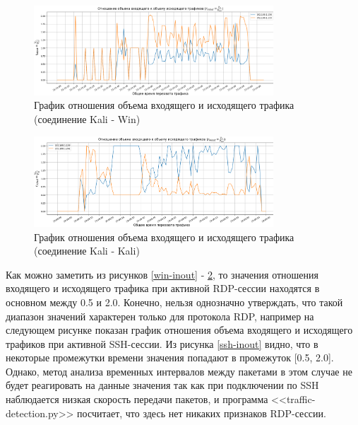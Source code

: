 \documentclass[bachelor, och, coursework]{SCWorks}
\begin{document}


\begin{figure}[H]
  \centering
  \includegraphics[width=0.8\textwidth]{photo/inout-kalwin.png}
  \caption{График отношения объема входящего и исходящего трафика (соединение Kali - Win)}
  \label{kalwin-inout}
\end{figure}


\begin{figure}[H]
  \centering
  \includegraphics[width=0.8\textwidth]{photo/inout-kali.png}
  \caption{График отношения объема входящего и исходящего трафика (соединение Kali - Kali)}
  \label{kali-inout}
\end{figure}

Как можно заметить из рисунков \ref{win-inout} - \ref{kali-inout}, то значения отношения входящего и исходящего трафика
при активной RDP-сессии находятся в основном между 0.5 и 2.0. Конечно, нельзя однозначно утверждать, что такой диапазон
значений характерен только для протокола RDP, например на следующем рисунке показан график отношения объема входящего и
исходящего трафиков при активной SSH-сессии. Из рисунка \ref{ssh-inout}
видно, что в некоторые промежутки времени значения попадают в промежуток [0.5, 2.0]. Однако, метод анализа временных интервалов между пакетами
в этом случае не будет реагировать на данные значения так как при подключении по SSH наблюдается низкая скорость передачи пакетов,
и программа <<traffic-detection.py>> посчитает, что здесь нет никаких признаков RDP-сессии.
\end{document}
